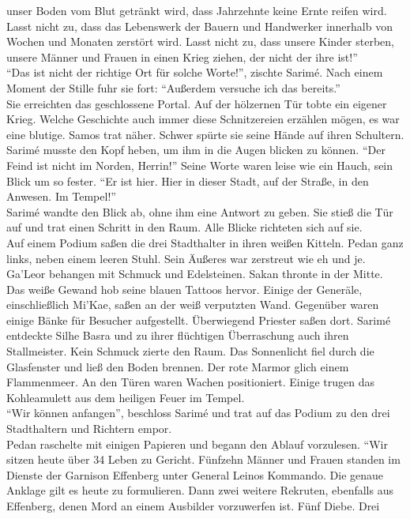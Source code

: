 unser Boden vom Blut getränkt wird, dass Jahrzehnte keine Ernte reifen wird. Lasst nicht zu, dass 
das Lebenswerk der Bauern und Handwerker innerhalb von Wochen und Monaten zerstört wird. Lasst 
nicht zu, dass unsere Kinder sterben, unsere Männer und Frauen in einen Krieg ziehen, der nicht der 
ihre ist!''\\
``Das ist nicht der richtige Ort für solche Worte!'', zischte Sarimé. Nach einem Moment der Stille 
fuhr sie fort: ``Außerdem versuche ich das bereits.''\\
Sie erreichten das geschlossene Portal. Auf der hölzernen Tür tobte ein eigener Krieg. Welche 
Geschichte auch immer diese Schnitzereien erzählen mögen, es war eine blutige. Samos trat näher. 
Schwer spürte sie seine Hände auf ihren Schultern. Sarimé musste den Kopf heben, um ihm in die 
Augen blicken zu können. ``Der Feind ist nicht im Norden, Herrin!'' Seine Worte waren leise wie ein 
Hauch, sein Blick um so fester. ``Er ist hier. Hier in dieser Stadt, auf der Straße, in den 
Anwesen. Im Tempel!''\\
Sarimé wandte den Blick ab, ohne ihm eine Antwort zu geben. Sie stieß die Tür auf und trat einen 
Schritt in den Raum. Alle Blicke richteten sich auf sie.\\
Auf einem Podium saßen die drei Stadthalter in ihren weißen Kitteln. Pedan ganz links, neben einem 
leeren Stuhl. Sein Äußeres war zerstreut wie eh und je. Ga'Leor behangen mit Schmuck und 
Edelsteinen. Sakan thronte in der Mitte. Das weiße Gewand hob seine blauen Tattoos hervor. Einige 
der Generäle, einschließlich Mi'Kae, saßen an der weiß verputzten Wand. Gegenüber waren einige Bänke 
für Besucher aufgestellt. Überwiegend Priester saßen dort. Sarimé entdeckte Silhe Basra und zu 
ihrer flüchtigen Überraschung auch ihren Stallmeister. Kein Schmuck zierte den Raum. Das 
Sonnenlicht fiel durch die Glasfenster und ließ den Boden brennen. Der rote Marmor glich einem 
Flammenmeer. An den Türen waren Wachen positioniert. Einige trugen das Kohleamulett aus dem heiligen 
Feuer im Tempel.\\
``Wir können anfangen'', beschloss Sarimé und trat auf das Podium zu den drei Stadthaltern und 
Richtern empor.\\
Pedan raschelte mit einigen Papieren und begann den Ablauf vorzulesen. ``Wir sitzen heute über 34 
Leben zu Gericht. Fünfzehn Männer und Frauen standen im Dienste der Garnison Effenberg unter 
General Leinos Kommando. Die genaue Anklage gilt es heute zu formulieren. Dann zwei weitere 
Rekruten, ebenfalls aus Effenberg, denen Mord an einem Ausbilder vorzuwerfen ist. Fünf Diebe. Drei 
